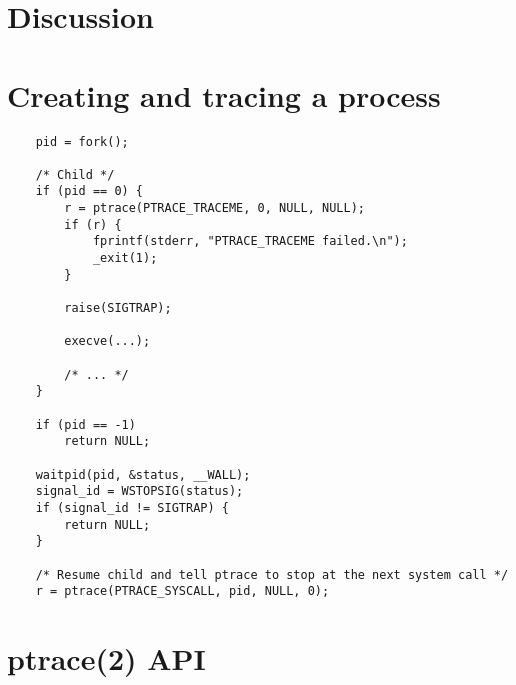 \documentclass[a4paper, 10pt]{report}
\begin{document}
% 



\chapter{Discussion}




\pagebreak

\appendix
\addappheadtotoc

\chapter{Creating and tracing a process}
\label{appendix:createtrace}

\begin{lstlisting}
    pid = fork();

    /* Child */
    if (pid == 0) {
        r = ptrace(PTRACE_TRACEME, 0, NULL, NULL);
        if (r) {
            fprintf(stderr, "PTRACE_TRACEME failed.\n");
            _exit(1);
        }

        raise(SIGTRAP);

        execve(...);

        /* ... */
    }

    if (pid == -1)
        return NULL;

    waitpid(pid, &status, __WALL);
    signal_id = WSTOPSIG(status);
    if (signal_id != SIGTRAP) {
        return NULL;
    }

    /* Resume child and tell ptrace to stop at the next system call */
    r = ptrace(PTRACE_SYSCALL, pid, NULL, 0);
\end{lstlisting}

\chapter{ptrace(2) API}
\label{ptrace-api}
\end{document}

